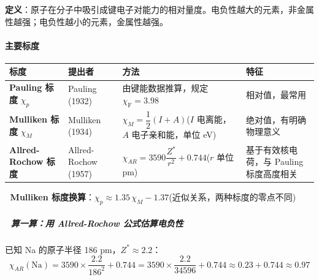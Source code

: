 \textbf{定义}：原子在分子中吸引成键电子对能力的相对量度。电负性越大的元素，非金属性越强；电负性越小的元素，金属性越强。

\paragraph{主要标度}\label{ux4e3bux8981ux6807ux5ea6}

{\def\LTcaptype{none} %
\begin{longtable}[]{@{}
  >{\raggedright\arraybackslash}p{}
  >{\raggedright\arraybackslash}p{}
  >{\raggedright\arraybackslash}p{}
  >{\raggedright\arraybackslash}p{}@{}}
\toprule\noalign{}
\begin{minipage}[b]{\linewidth}\raggedright
标度
\end{minipage} & \begin{minipage}[b]{\linewidth}\raggedright
提出者
\end{minipage} & \begin{minipage}[b]{\linewidth}\raggedright
方法
\end{minipage} & \begin{minipage}[b]{\linewidth}\raggedright
特征
\end{minipage} \\
\midrule\noalign{}
\endhead
\bottomrule\noalign{}
\endlastfoot
\textbf{Pauling 标度} \(\chi_p\) & Pauling (1932) & 由键能数据推算，规定 \(\chi_{\mathrm{F}}=3.98\) & 相对值，最常用 \\
\textbf{Mulliken 标度} \(\chi_M\) & Mulliken (1934) & \(\chi_M = \dfrac{1}{2}(I + A)\)(\(I\) 电离能，\(A\) 电子亲和能，单位 eV) & 绝对值，有明确物理意义 \\
\textbf{Allred-Rochow 标度} & Allred-Rochow (1957) & \(\chi_{AR} = 3590\dfrac{Z^*}{r^2} + 0.744\)(\(r\) 单位 pm) & 基于有效核电荷，与 Pauling 标度高度相关 \\
\end{longtable}
}

🔗 \textbf{Mulliken 标度换算}：\(\chi_p \approx 1.35\,\chi_M - 1.37\)(近似关系，两种标度的零点不同)

\subparagraph{📝 算一算：用 Allred-Rochow 公式估算电负性}\label{ux7b97ux4e00ux7b97ux7528-allred-rochow-ux516cux5f0fux4f30ux7b97ux7535ux8d1fux6027}

已知 Na 的原子半径 186 pm，\(Z^* \approx 2.2\)：
\[\chi_{AR}(\mathrm{Na}) = 3590 \times \frac{2.2}{186^2} + 0.744 = 3590 \times \frac{2.2}{34596} + 0.744 \approx 0.23 + 0.744 \approx 0.97\]

